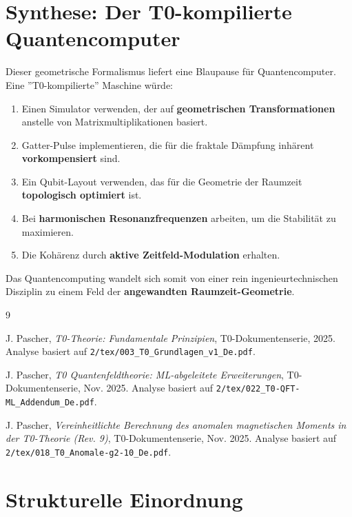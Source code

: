 	\section{Synthese: Der T0-kompilierte Quantencomputer}
	
	Dieser geometrische Formalismus liefert eine Blaupause für Quantencomputer. Eine ''T0-kompilierte'' Maschine würde:
	\begin{enumerate}
		\item Einen Simulator verwenden, der auf \textbf{geometrischen Transformationen} anstelle von Matrixmultiplikationen basiert.
		\item Gatter-Pulse implementieren, die für die fraktale Dämpfung inhärent \textbf{vorkompensiert} sind.
		\item Ein Qubit-Layout verwenden, das für die Geometrie der Raumzeit \textbf{topologisch optimiert} ist.
		\item Bei \textbf{harmonischen Resonanzfrequenzen} arbeiten, um die Stabilität zu maximieren.
		\item Die Kohärenz durch \textbf{aktive Zeitfeld-Modulation} erhalten.
	\end{enumerate}
	Das Quantencomputing wandelt sich somit von einer rein ingenieurtechnischen Disziplin zu einem Feld der \textbf{angewandten Raumzeit-Geometrie}.
	
	\begin{thebibliography}{9}
		
		J. Pascher, \textit{T0-Theorie: Fundamentale Prinzipien}, T0-Dokumentenserie, 2025.
		Analyse basiert auf \texttt{2/tex/003\_T0\_Grundlagen\_v1\_De.pdf}.
		
		J. Pascher, \textit{T0 Quantenfeldtheorie: ML-abgeleitete Erweiterungen}, T0-Dokumentenserie, Nov. 2025.
		Analyse basiert auf \texttt{2/tex/022\_T0-QFT-ML\_Addendum\_De.pdf}.
		
		J. Pascher, \textit{Vereinheitlichte Berechnung des anomalen magnetischen Moments in der T0-Theorie (Rev. 9)}, T0-Dokumentenserie, Nov. 2025.
		Analyse basiert auf \texttt{2/tex/018\_T0\_Anomale-g2-10\_De.pdf}.
		
	\end{thebibliography}

\section{Strukturelle Einordnung}

